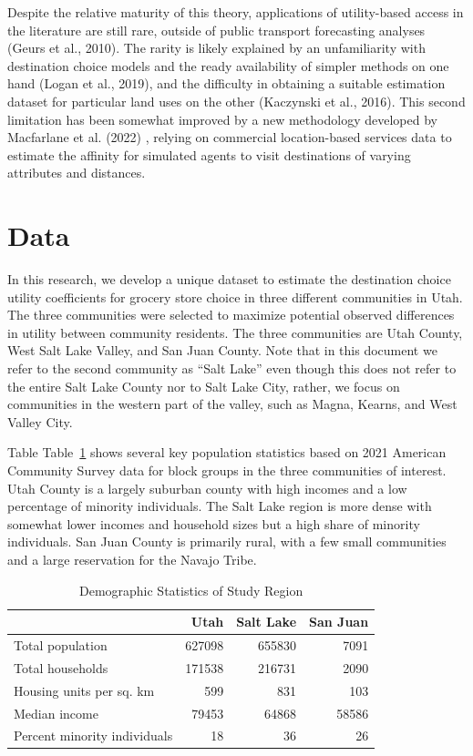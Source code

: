\documentclass[
  letterpaper,
  DIV=11,
  numbers=noendperiod]{scrreport}
\begin{document}
Despite the relative maturity of this theory, applications of
utility-based access in the literature are still rare, outside of public
transport forecasting analyses (Geurs et al., 2010). The rarity is
likely explained by an unfamiliarity with destination choice models and
the ready availability of simpler methods on one hand (Logan et al.,
2019), and the difficulty in obtaining a suitable estimation dataset for
particular land uses on the other (Kaczynski et al., 2016). This second
limitation has been somewhat improved by a new methodology developed by
Macfarlane et al. (2022) , relying on commercial location-based services
data to estimate the affinity for simulated agents to visit destinations
of varying attributes and distances.

\hypertarget{data}{%
\section{Data}\label{data}}

In this research, we develop a unique dataset to estimate the
destination choice utility coefficients for grocery store choice in
three different communities in Utah. The three communities were selected
to maximize potential observed differences in utility between community
residents. The three communities are Utah County, West Salt Lake Valley,
and San Juan County. Note that in this document we refer to the second
community as ``Salt Lake'' even though this does not refer to the entire
Salt Lake County nor to Salt Lake City, rather, we focus on communities
in the western part of the valley, such as Magna, Kearns, and West
Valley City.

Table Table~\ref{tbl-acsdata} shows several key population statistics
based on 2021 American Community Survey data for block groups in the
three communities of interest. Utah County is a largely suburban county
with high incomes and a low percentage of minority individuals. The Salt
Lake region is more dense with somewhat lower incomes and household
sizes but a high share of minority individuals. San Juan County is
primarily rural, with a few small communities and a large reservation
for the Navajo Tribe.

\hypertarget{tbl-acsdata}{}
\begin{table}
\caption{\label{tbl-acsdata}Demographic Statistics of Study Region }\tabularnewline

\centering
\begin{tabular}[t]{lrrr}
\toprule
 & Utah & Salt Lake & San Juan\\
\midrule
Total population & 627098 & 655830 & 7091\\
Total households & 171538 & 216731 & 2090\\
Housing units per sq. km & 599 & 831 & 103\\
Median income & 79453 & 64868 & 58586\\
Percent minority individuals & 18 & 36 & 26\\
\bottomrule
\end{tabular}
\end{table}
\end{document}

